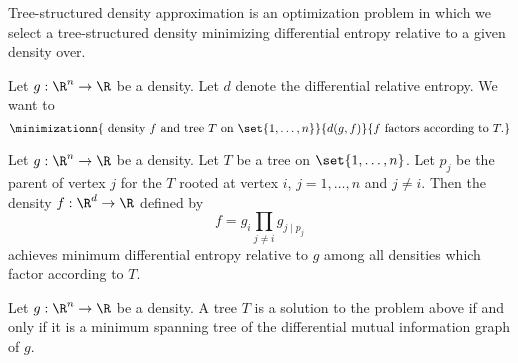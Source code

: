 


Tree-structured density
approximation is an
optimization problem in which we
select a tree-structured density
minimizing differential entropy
relative to a given density over.


Let $g: \R^n \to \R$ be a density.
Let $d$ denote the differential
relative entropy.
We want to
\[
  \minimizationn{
    \text{ density } f \text{ and tree } T \text{ on } \set{1, \dots, n}
  }{
    d(g, f)
  }{
    f \text{ factors according to } T.
  }
\]


\begin{prop}
  Let $g: \R^n \to \R$ be a density.
  Let $T$ be
  a tree on $\set{1, \dots, n}$.
  Let $p_j$ be
  the parent of vertex $j$ for the $T$ rooted
  at vertex $i$, $j = 1,\dots,n$ and $j \neq i$.
  Then the density $f: \R^d \to \R$ defined by
  \[
    f = g_i \prod_{j \neq i} g_{j \mid p_j}
  \]
  achieves minimum differential entropy relative to $g$ among
  all densities which factor according to $T$.
\end{prop}

\begin{prop}
  Let $g: \R^n \to \R$ be a density.
  A tree $T$ is a solution to the problem above
  if and only if it is a minimum spanning
  tree of the differential mutual information graph of $g$.
\end{prop}
